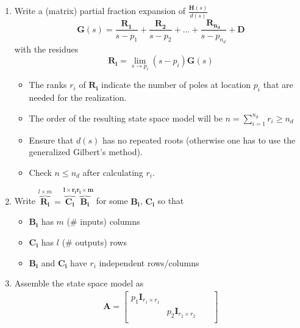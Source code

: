 \newpar{}
\begin{enumerate}
    \item Write a (matrix) partial fraction expansion of $\frac{\mathbf{H}(s)}{d(s)}$
          \begin{equation*}
              \mathbf{G}(s)=\frac{\mathbf{R_1}}{s-p_1}+\frac{\mathbf{R_2}}{s-p_2}+\ldots+\frac{\mathbf{R_{n_d}}}{s-p_{n_d}}+\mathbf{D}
          \end{equation*} with the residues
          \begin{equation*}
              \mathbf{R_i}=\lim_{s\to p_i}(s-p_i)\mathbf{G}(s)
          \end{equation*}
          \begin{itemize}
              \item The ranks $r_i$ of $\mathbf{R_i}$ indicate the number of poles at location $p_i$ that are needed for the realization.
              \item The order of the resulting state space model will be $n=\sum_{i=1}^{n_d}r_i\geq n_d$
              \item Ensure that $d(s)$ has no repeated roots (otherwise one has to use the generalized Gilbert's method).
              \item Check $n\le n_d$ after calculating $r_i$.
          \end{itemize}
    \item Write $\overbrace{\mathbf{R_i}}^{l\times m}=\mathbf{\overbrace{\mathbf{C}_i}^{l\times r_i}\overbrace{ \mathbf{B}_i}^{r_i \times m}}$ for some $\mathbf{B_i}$, $\mathbf{C_i}$ so that
          \begin{itemize}
              \item $\mathbf{B_i}$ has $m$ (\# inputs) columns
              \item $\mathbf{C_i}$ has $l$ (\# outputs) rows
              \item $\mathbf{B_i}$ and $\mathbf{C_i}$ have $r_i$ independent rows/columns
          \end{itemize}
    \item Assemble the state space model as
          \begin{gather*}
              \mathbf{A}  =\begin{bmatrix}
                  p_1 \mathbf{I}_{r_1\times r_1} &                                &        &                                            \\
                                                 & p_2 \mathbf{I}_{r_2\times r_2} &        &                                            \\

\end{bmatrix}
\end{gather*}
\end{enumerate}
